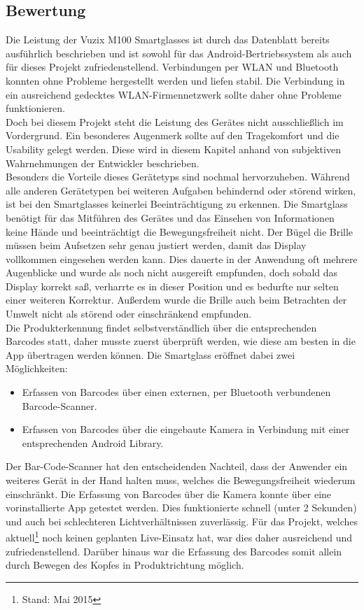 \subsection{Bewertung}
Die Leistung der Vuzix M100 Smartglasses ist durch das Datenblatt bereits ausführlich beschrieben und ist sowohl für das Android-Bertriebssystem als auch für dieses Projekt zufriedenstellend. Verbindungen per \ac{WLAN} und Bluetooth konnten ohne Probleme hergestellt werden und liefen stabil. Die Verbindung in ein ausreichend gedecktes \ac{WLAN}-Firmennetzwerk sollte daher ohne Probleme funktionieren.\\

Doch bei diesem Projekt steht die Leistung des Gerätes nicht ausschließlich im Vordergrund. Ein besonderes Augenmerk sollte auf den Tragekomfort und die Usability gelegt werden. Diese wird in diesem Kapitel anhand von subjektiven Wahrnehmungen der Entwickler beschrieben.\\

Besonders die Vorteile dieses Gerätetyps sind nochmal hervorzuheben. Während alle anderen Gerätetypen bei weiteren Aufgaben behindernd oder störend wirken, ist bei den Smartglasses keinerlei Beeinträchtigung zu erkennen. Die Smartglass benötigt für das Mitführen des Gerätes und das Einsehen von Informationen keine Hände und beeinträchtigt die Bewegungsfreiheit nicht. Der Bügel \bzw die Brille müssen beim Aufsetzen sehr genau justiert werden, damit das Display vollkommen eingesehen werden kann. Dies dauerte in der Anwendung oft mehrere Augenblicke und wurde als noch nicht ausgereift empfunden, doch sobald das Display korrekt saß, verharrte es in dieser Position und es bedurfte nur selten einer weiteren Korrektur. Außerdem wurde die Brille auch beim Betrachten der Umwelt nicht als störend oder einschränkend empfunden.\\

Die Produkterkennung findet selbstverständlich über die entsprechenden Barcodes statt, daher musste zuerst überprüft werden, wie diese am besten in die App übertragen werden können. Die Smartglass eröffnet dabei zwei Möglichkeiten:
\begin{itemize}
	\item Erfassen von Barcodes über einen externen, per Bluetooth verbundenen Barcode-Scanner.
	\item Erfassen von Barcodes über die eingebaute Kamera in Verbindung mit einer entsprechenden Android Library.
\end{itemize}
Der Bar-Code-Scanner hat den entscheidenden Nachteil, dass der Anwender ein weiteres Gerät in der Hand halten muss, welches die Bewegungsfreiheit wiederum einschränkt. Die Erfassung von Barcodes über die Kamera konnte über eine vorinstallierte App getestet werden. Dies funktionierte schnell (unter 2 Sekunden) und auch bei schlechteren Lichtverhältnissen zuverlässig. Für das Projekt, welches aktuell\footnote{Stand: Mai 2015} noch keinen geplanten Live-Einsatz hat, war dies daher ausreichend und zufriedenstellend. Darüber hinaus war die Erfassung des Barcodes somit allein durch Bewegen des Kopfes in Produktrichtung möglich.\\

